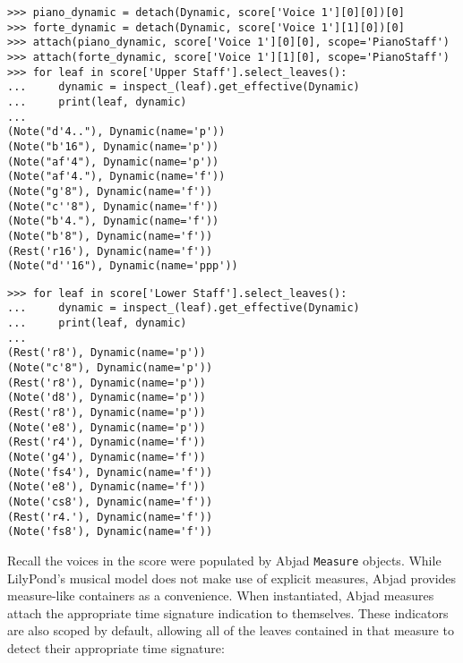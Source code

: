 \begin{abjadbookoutput}
\begin{singlespacing}
\vspace{-0.5\baselineskip}
\begin{lstlisting}
>>> piano_dynamic = detach(Dynamic, score['Voice 1'][0][0])[0]
>>> forte_dynamic = detach(Dynamic, score['Voice 1'][1][0])[0]
>>> attach(piano_dynamic, score['Voice 1'][0][0], scope='PianoStaff')
>>> attach(forte_dynamic, score['Voice 1'][1][0], scope='PianoStaff')
>>> for leaf in score['Upper Staff'].select_leaves():
...     dynamic = inspect_(leaf).get_effective(Dynamic)
...     print(leaf, dynamic)
...
(Note("d'4.."), Dynamic(name='p'))
(Note("b'16"), Dynamic(name='p'))
(Note("af'4"), Dynamic(name='p'))
(Note("af'4."), Dynamic(name='f'))
(Note("g'8"), Dynamic(name='f'))
(Note("c''8"), Dynamic(name='f'))
(Note("b'4."), Dynamic(name='f'))
(Note("b'8"), Dynamic(name='f'))
(Rest('r16'), Dynamic(name='f'))
(Note("d''16"), Dynamic(name='ppp'))
\end{lstlisting}
\begin{lstlisting}
>>> for leaf in score['Lower Staff'].select_leaves():
...     dynamic = inspect_(leaf).get_effective(Dynamic)
...     print(leaf, dynamic)
...
(Rest('r8'), Dynamic(name='p'))
(Note("c'8"), Dynamic(name='p'))
(Rest('r8'), Dynamic(name='p'))
(Note('d8'), Dynamic(name='p'))
(Rest('r8'), Dynamic(name='p'))
(Note('e8'), Dynamic(name='p'))
(Rest('r4'), Dynamic(name='f'))
(Note('g4'), Dynamic(name='f'))
(Note('fs4'), Dynamic(name='f'))
(Note('e8'), Dynamic(name='f'))
(Note('cs8'), Dynamic(name='f'))
(Rest('r4.'), Dynamic(name='f'))
(Note('fs8'), Dynamic(name='f'))
\end{lstlisting}
\end{singlespacing}
\end{abjadbookoutput}

\noindent Recall the voices in the score were populated by Abjad
\texttt{Measure} objects. While LilyPond's musical model does not make use of
explicit measures, Abjad provides measure-like containers as a convenience.
When instantiated, Abjad measures attach the appropriate time signature
indication to themselves. These indicators are also scoped by default, allowing
all of the leaves contained in that measure to detect their appropriate time
signature:

\begin{comment}
<abjad>
measure_1 = score['Voice 1'][0]
measure_2 = score['Voice 1'][1]
inspect_(measure_1).get_indicator(TimeSignature)
for leaf in measure_1.select_leaves():
    time_signature = inspect_(leaf).get_effective(TimeSignature)
    print(leaf, time_signature)

inspect_(measure_2).get_indicator(TimeSignature)
for leaf in measure_2.select_leaves():
    time_signature = inspect_(leaf).get_effective(TimeSignature)
    print(leaf, time_signature)

</abjad>
\end{comment}

